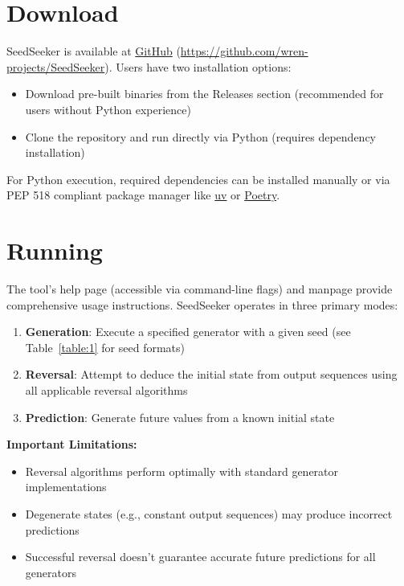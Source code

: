 \documentclass[12pt, a4paper]{report}
\begin{document}
\section{Download}
SeedSeeker is available at \href{https://github.com/wren-projects/SeedSeeker}{GitHub} 
(\url{https://github.com/wren-projects/SeedSeeker}). Users have two installation options:

\begin{itemize}
    \item Download pre-built binaries from the Releases section (recommended for users without Python experience)
    \item Clone the repository and run directly via Python (requires dependency installation)
\end{itemize}

For Python execution, required dependencies can be installed manually or via PEP 518 compliant package manager like 
\href{https://github.com/astral-sh/uv}{uv} or \href{https://python-poetry.org}{Poetry}.

\section{Running}
The tool's help page (accessible via command-line flags) and manpage provide comprehensive usage instructions. 
SeedSeeker operates in three primary modes:

\begin{enumerate}
    \item \textbf{Generation}: Execute a specified generator with a given seed 
        (see Table~\ref{table:1} for seed formats)
    \item \textbf{Reversal}: Attempt to deduce the initial state 
        from output sequences using all applicable reversal algorithms
    \item \textbf{Prediction}: Generate future values from a known initial state
\end{enumerate}

\textbf{Important Limitations:}
\begin{itemize}
    \item Reversal algorithms perform optimally with standard generator implementations
    \item Degenerate states (e.g., constant output sequences) may produce incorrect predictions
    \item Successful reversal doesn't guarantee accurate future predictions for all generators
\end{itemize}
\end{document}
